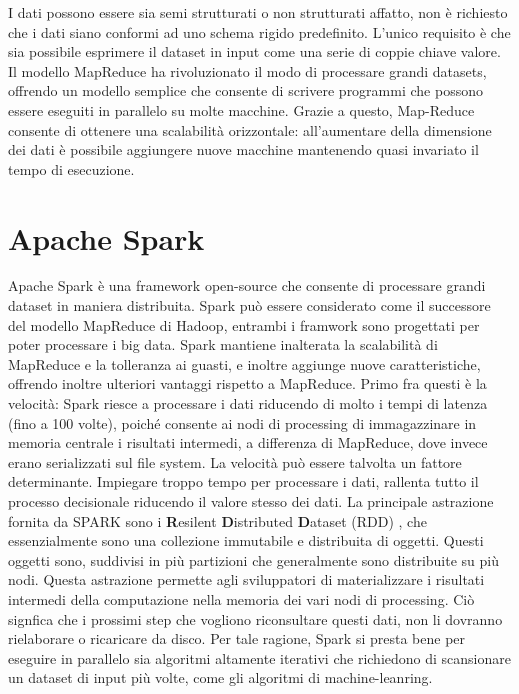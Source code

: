I dati possono essere sia semi strutturati o non strutturati affatto, non è richiesto che i dati siano conformi ad uno schema rigido predefinito. L'unico requisito è che sia possibile esprimere il dataset in input come una serie di coppie chiave valore.
Il modello MapReduce ha rivoluzionato il modo di processare grandi datasets, offrendo un modello semplice che consente di scrivere programmi che possono essere eseguiti in parallelo su molte macchine. Grazie a questo, Map-Reduce consente di ottenere una scalabilità orizzontale: all'aumentare della dimensione dei dati è possibile aggiungere nuove macchine mantenendo quasi invariato il tempo di esecuzione.
\section{Apache Spark}
Apache Spark \cite{Zaharia:2010:SCC:1863103.1863113} è una framework open-source che consente di processare grandi dataset in maniera distribuita.
Spark può essere considerato come il successore del modello MapReduce di Hadoop, entrambi i framwork sono progettati per poter processare i big data.  Spark mantiene inalterata la scalabilità di MapReduce e la tolleranza ai guasti, e inoltre aggiunge nuove caratteristiche, offrendo inoltre ulteriori vantaggi rispetto a MapReduce. Primo fra questi è la velocità: Spark riesce a processare i dati riducendo  di molto i tempi di latenza (fino a 100 volte), poiché  consente ai nodi di processing di immagazzinare in memoria centrale i risultati intermedi, a differenza di MapReduce, dove invece erano serializzati sul file system.  La velocità può essere talvolta un fattore determinante. Impiegare troppo tempo per processare i dati, rallenta tutto il processo decisionale riducendo il valore stesso dei dati.
La principale astrazione fornita da SPARK sono i \textbf{R}esilent \textbf{D}istributed \textbf{D}ataset (RDD) \cite{Zaharia:2012:RDD:2228298.2228301}, che essenzialmente sono una collezione immutabile e distribuita di oggetti. Questi oggetti sono, suddivisi in più partizioni che  generalmente sono distribuite su più nodi.
Questa astrazione permette agli sviluppatori di materializzare i risultati intermedi della computazione  nella memoria dei vari nodi di processing. Ciò signfica che i prossimi step che vogliono riconsultare questi dati, non li dovranno rielaborare o ricaricare da disco.
Per tale ragione, Spark si presta bene per eseguire in parallelo sia algoritmi altamente iterativi che richiedono di scansionare un dataset di input più volte, come gli algoritmi di machine-leanring.

